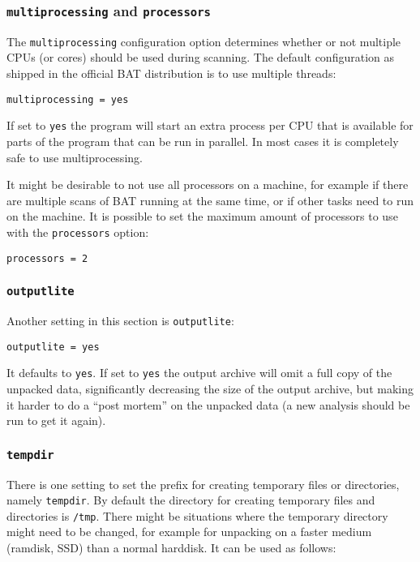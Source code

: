 \documentclass[10pt,a4paper]{article}
\begin{document}
\subsubsection{\texttt{multiprocessing} and \texttt{processors}}

The \texttt{multiprocessing} configuration option determines whether or not
multiple CPUs (or cores) should be used during scanning. The default
configuration as shipped in the official BAT distribution is to use multiple
threads:

\begin{verbatim}
multiprocessing = yes
\end{verbatim}

If set to \texttt{yes} the program will start an extra process per CPU that is
available for parts of the program that can be run in parallel. In most cases
it is completely safe to use multiprocessing.

It might be desirable to not use all processors on a machine, for example if
there are multiple scans of BAT running at the same time, or if other tasks
need to run on the machine. It is possible to set the maximum amount of
processors to use with the \texttt{processors} option:

\begin{verbatim}
processors = 2
\end{verbatim}

\subsubsection{\texttt{outputlite}}

Another setting in this section is \texttt{outputlite}:

\begin{verbatim}
outputlite = yes
\end{verbatim}

It defaults to \texttt{yes}. If set to \texttt{yes} the output archive will omit
a full copy of the unpacked data, significantly decreasing the size of the
output archive, but making it harder to do a ``post mortem'' on the unpacked
data (a new analysis should be run to get it again).

\subsubsection{\texttt{tempdir}}

There is one setting to set the prefix for creating temporary files or
directories, namely \texttt{tempdir}. By default the directory for creating
temporary files and directories is \texttt{/tmp}. There might be situations
where the temporary directory might need to be changed, for example for
unpacking on a faster medium (ramdisk, SSD) than a normal harddisk. It can be
used as follows:
\end{document}
